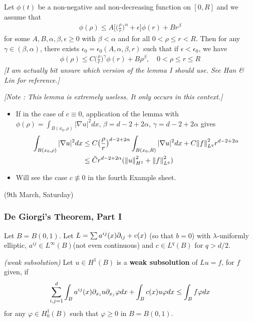 \documentclass[12pt,a4paper]{article}
\begin{document}
\lem Let $\phi(t)$ be a non-negative and non-decreasing function on $[0, R]$ and we assume that
\begin{align*}
\phi(\rho) \leq A \Big[ \big( \frac{\rho}{r}\big)^{\alpha} + \epsilon \Big] \phi(r) + Br^{\beta}
\end{align*}
for some $A, B, \alpha, \beta, \epsilon \geq 0$ with $\beta <\alpha$ and for all $0< \rho \leq r <R$. Then for any $\gamma \in (\beta, \alpha)$, there exists $\epsilon_0 = \epsilon_0 (A, \alpha, \beta, r)$ such that if $\epsilon < \epsilon_0$, we have
\begin{align*}
\phi(\rho) \leq C\big( \frac{\rho}{r} \big)^{\gamma} \phi(r) + B \rho^{\beta}, \quad 0< \rho \leq r\leq R
\end{align*}
\emph{[I am actually bit unsure which version of the lemma I should use. See Han \& Lin for reference.]}

\emph{[Note : This lemma is extremely useless. It only occurs in this context.]}

\eos
\s

\begin{itemize}
\item If in the case of $c\equiv 0$, application of the lemma with $\phi(\rho) = \int_{B(x_0, \rho)} |\nabla u|^2 dx$, $\beta =d-2+2\alpha$, $\gamma =d-2+2\alpha$ gives
\begin{align*}
\int_{B(x_0, \rho)} |\nabla u|^2 dx & \leq C \big( \frac{\rho}{r} \big)^{d-2+2\alpha} \int_{B(x_0, R)} |\nabla u|^2 dx + C \snorms{f}{L^q}^2 r^{d-2+2\alpha} \\
& \leq \tilde{C} r^{d-2+2\alpha} (\snorms{u}{H^1}^2 + \snorms{f}{L^q}^2)
\end{align*}
\item Will see the case $c \not\equiv 0$ in the fourth Example sheet.
\end{itemize}
\s

\newday

(9th March, Saturday)

\subsubsection*{De Giorgi's Theorem, Part I}

Let $B= B(0,1)$. Let $L = \sum a^{ij}(x) \partial_{ij} + c(x)$ (so that $b=0$) with $\lambda$-uniformly elliptic, $a^{ij} \in L^{\infty}(B)$(not even continuous) and $c\in L^q(B)$ for $q> d/2$.
\s

 \emph{(weak subsolution)} Let $u\in H^1(B)$ is a \textbf{weak subsolution} of $Lu =f$, for $f$ given, if
\begin{align*}
\sum_{i,j=1}^d \int_B a^{ij}(x) \partial_{x_i} u \partial_{x_j} \varphi dx + \int_B c(x) u\varphi dx \leq \int_B f\varphi dx
\end{align*}
for any $\varphi \in H_0^1(B)$ such that $\varphi \geq 0$ in $B=B(0,1)$.
\s
\end{document}
